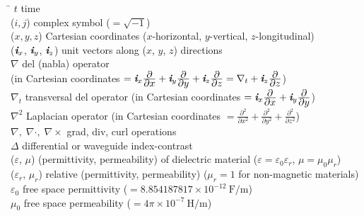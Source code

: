 \begin{tabbing}
  \hspace{6em} \= \hspace{20em} \kill
  $t$ \> time \\
  ($i, j$) \> complex symbol ($ = \sqrt{-1}$) \\
  ($x, y, z$) \> Cartesian coordinates ($x$-horizontal, $y$-vertical, $z$-longitudinal) \\
  ($\emph{\textbf{i}}_{x}$, $\emph{\textbf{i}}_{y}$, $\emph{\textbf{i}}_{z}$)
        \> unit vectors along ($x$, $y$, $z$) directions \\
  $\nabla$ \> del (nabla) operator \\
  {} \> (in Cartesian coordinates
              $= \emph{\textbf{i}}_{x} \frac{\displaystyle \partial}{\displaystyle \partial x}
              +\emph{\textbf{i}}_{y}\frac{\displaystyle \partial}{\displaystyle \partial y}
              +\emph{\textbf{i}}_{z}\frac{\displaystyle \partial}{\displaystyle \partial z}
              = \nabla_t+\emph{\textbf{i}}_{z}\frac{\displaystyle \partial}{\displaystyle \partial z}$) \\
  $\nabla_t$ \> transversal del operator (in Cartesian coordinates
              $= \emph{\textbf{i}}_{x} \frac{\displaystyle \partial}{\displaystyle \partial x}
              +\emph{\textbf{i}}_{y}\frac{\displaystyle \partial}{\displaystyle \partial y}$) \\
  $\nabla^2$ \> Laplacian operator (in Cartesian coordinates
              $= \frac{\displaystyle \partial^2}{\displaystyle \partial x^2}
              + \frac{\displaystyle \partial^2}{\displaystyle \partial y^2}
              + \frac{\displaystyle \partial^2}{\displaystyle \partial z^2}$) \\
  $\nabla,\; \nabla \cdot,\; \nabla \times $ \> grad, div, curl operations \\
  $\Delta$ \> differential or waveguide index-contrast \\
  ($\varepsilon$, $\mu$) \> (permittivity, permeability) of dielectric material
                ($\varepsilon= \varepsilon_0 \varepsilon_r$, $ \mu = \mu_0 \mu_r$) \\
  ($\varepsilon_r$, $\mu_r$) \> relative (permittivity, permeability) ($\mu_r=1$ for non-magnetic materials) \\
  $\varepsilon_0$ \> free space permittivity ($=8.854187817 \times 10^{-12}{\ }\textrm{F/m}$) \\
  $\mu_0$ \> free space permeability ($=4\pi\times10^{-7}{\ }\textrm{H/m}$) \\

\end{tabbing}
